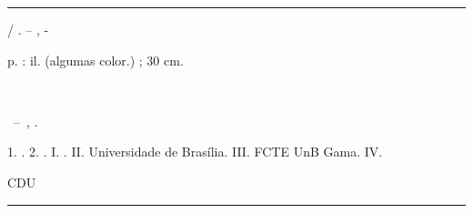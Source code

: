\begin{fichacatalografica}
	\vspace*{\fill}					%
	\hrule							%
	\begin{center}					%
	\begin{minipage}[c]{12.5cm}		%
	\raggedright
	\imprimirautor
	
	\hspace{0.5cm} \imprimirtitulo  / \imprimirautor. --
	\imprimirlocal, \imprimirdata-
	
	\hspace{0.5cm} \pageref{LastPage} p. : il. (algumas color.) ; 30 cm.\par
	
	\hspace{0.5cm} \imprimirorientadorRotulo~\imprimirorientador\par
	
	\hspace{0.5cm} \parbox[t]{\textwidth}{\imprimirtipotrabalho~--~\imprimirinstituicao, \imprimirdata.}\par
	
	\hspace{0.5cm}
		1. \imprimirpalavrachaveum.
		2. \imprimirpalavrachavedois.
		I. \imprimirorientador.
		II. Universidade de Brasília.
		III. FCTE UnB Gama.
		IV. \imprimirtitulo\par		
	
	\hspace{8.75cm} CDU \nomecdu\par
	
	\end{minipage}
	\end{center}
	\hrule
\end{fichacatalografica}
